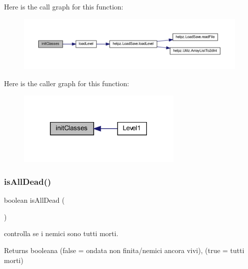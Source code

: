 Here is the call graph for this function\+:\nopagebreak
\begin{figure}[H]
\begin{center}
\leavevmode
\includegraphics[width=350pt]{classscenes_1_1_level1_afe125d345675ffefe8da7e96d39773f3_cgraph}
\end{center}
\end{figure}
Here is the caller graph for this function\+:\nopagebreak
\begin{figure}[H]
\begin{center}
\leavevmode
\includegraphics[width=225pt]{classscenes_1_1_level1_afe125d345675ffefe8da7e96d39773f3_icgraph}
\end{center}
\end{figure}
\mbox{\label{classscenes_1_1_level1_acd1846d50c3d8678777f9ab6716f5cf3}} 
\subsubsection{\texorpdfstring{is\+All\+Dead()}{isAllDead()}}
{\footnotesize\ttfamily boolean is\+All\+Dead (\begin{DoxyParamCaption}{ }\end{DoxyParamCaption})\hspace{0.3cm}{\ttfamily [private]}}



controlla se i nemici sono tutti morti. 

\begin{DoxyReturn}{Returns}
booleana (false = ondata non finita/nemici ancora vivi), (true = tutti morti) 
\end{DoxyReturn}


